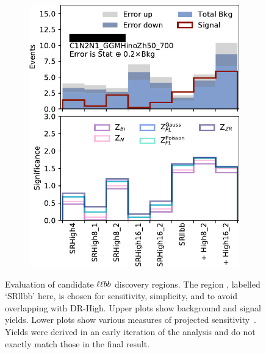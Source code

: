 \begin{figure}[tp]
\begin{subfigure}{0.495\textwidth}
\includegraphics[width=\textwidth]{figures/2ljets_disco_llbb_C1N2N1_GGMHinoZh50_700.png}
\caption{}
\end{subfigure}
\caption[
Evaluation of candidate $\llbb$ discovery regions
]{%
Evaluation of candidate $\llbb$ discovery regions.
The region \srllbb, labelled `SRllbb' here, is chosen for
sensitivity, simplicity, and to avoid overlapping with DR-High.
Upper plots show background and signal yields.
Lower plots show various measures of projected
sensitivity~\cite{cousins2008evaluation}.
Yields were derived in an early iteration of the analysis and do not exactly
match those in the final result.
}
\label{fig:2ljets_disco_trials_llbb}
\end{figure}

